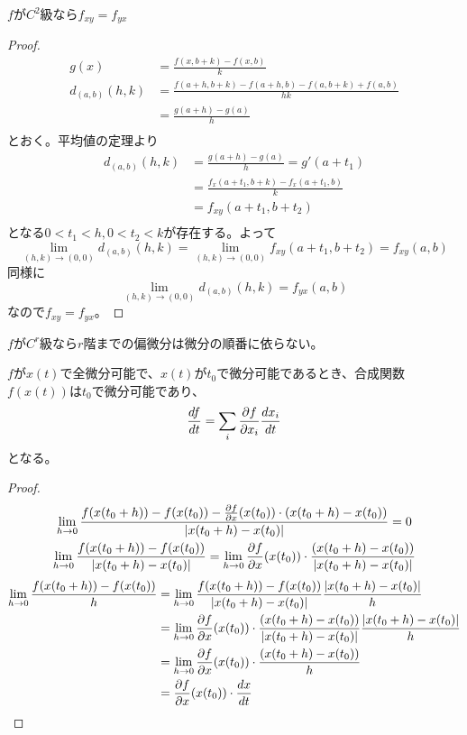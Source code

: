 	\begin{prop}
		$f$が$C^2$級なら$f_{xy} = f_{yx}$
	\end{prop}
	\begin{proof}
		\begin{align*}
			g(x) &= \frac{f(x, b + k) - f(x, b)}{k}\\
			d_{(a, b)}(h, k)
			&= \frac{f(a + h, b + k) - f(a + h, b) - f(a, b + k) + f(a, b)}{hk}\\
			&= \frac{g(a + h) - g(a)}{h}\\
		\end{align*}
		とおく。平均値の定理より
		\begin{align*}
			d_{(a, b)}(h, k)
			&= \frac{g(a + h) - g(a)}{h} = g'(a + t_1)\\
			&= \frac{f_x(a + t_1, b + k) - f_x(a + t_1, b)}{k}\\
			&= f_{xy}(a + t_1, b + t_2)\\
		\end{align*}
		となる$0 < t_1 < h, 0 < t_2 < k$が存在する。よって
			\[\lim_{(h, k) \to (0, 0)}d_{(a, b)}(h, k) = \lim_{(h, k) \to (0, 0)}f_{xy}(a + t_1, b + t_2) = f_{xy}(a, b)\]
		同様に
			\[\lim_{(h, k) \to (0, 0)}d_{(a, b)}(h, k) = f_{yx}(a, b)\]
		なので$f_{xy} = f_{yx}$。
	\end{proof}
	\begin{cor}
		$f$が$C^r$級なら$r$階までの偏微分は微分の順番に依らない。
	\end{cor}

	\begin{prop}[合成関数の微分]
		$f$が$x(t)$で全微分可能で、$x(t)$が$t_0$で微分可能であるとき、合成関数$f(x(t))$は$t_0$で微分可能であり、
			\[\de[f]{t} = \sum_i \pd[f]{x_i}\de[x_i]{t}\]
		となる。
	\end{prop}
	\begin{proof}
		\begin{gather*}
			\lim_{h \to 0} \frac{f(x(t_0 + h)) - f(x(t_0)) - \pd[f]{x}(x(t_0)) \cdot (x(t_0 + h) - x(t_0))}{|x(t_0 + h) - x(t_0)|} = 0\\
	        \lim_{h \to 0} \frac{f(x(t_0 + h)) - f(x(t_0))}{|x(t_0 + h) - x(t_0)|} = \lim_{h \to 0} \pd[f]{x}(x(t_0)) \cdot \frac{(x(t_0 + h) - x(t_0))}{|x(t_0 + h) - x(t_0)|}
	    \end{gather*}
	    \begin{align*}
	        \lim_{h \to 0} \frac{f(x(t_0 + h)) - f(x(t_0))}{h}
	        &= \lim_{h \to 0} \frac{f(x(t_0 + h)) - f(x(t_0))}{|x(t_0 + h) - x(t_0)|}\frac{|x(t_0 + h) - x(t_0)|}{h}\\
			&= \lim_{h \to 0} \pd[f]{x}(x(t_0)) \cdot \frac{(x(t_0 + h) - x(t_0))}{|x(t_0 + h) - x(t_0)|}\frac{|x(t_0 + h) - x(t_0)|}{h}\\
			&= \lim_{h \to 0} \pd[f]{x}(x(t_0)) \cdot \frac{(x(t_0 + h) - x(t_0))}{h}\\
			&= \pd[f]{x}(x(t_0)) \cdot \de[x]{t}
		\end{align*}
	\end{proof}

